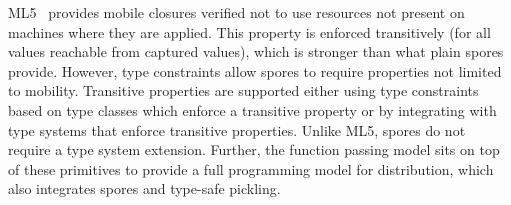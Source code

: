 \documentclass{jfp1}
\begin{document}
ML5~\cite{Tom7} provides mobile closures verified not to use resources not
present on machines where they are applied. This property is enforced
transitively (for all values reachable from captured values), which is stronger
than what plain spores provide. However, type constraints allow spores to
require properties not limited to mobility. Transitive properties are supported
either using type constraints based on type classes which enforce a transitive
property or by integrating with type systems that enforce transitive properties.
Unlike ML5, spores do not require a type system extension. Further, the function
passing model sits on top of these primitives to provide a full programming
model for distribution, which also integrates spores and type-safe pickling.

\end{document}
